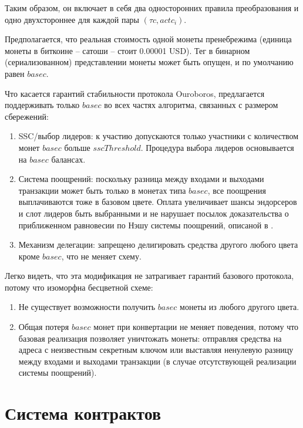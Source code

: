 \documentclass[specification,annotation]{itmo-student-thesis}
\begin{document}
Таким образом, он включает в себя два односторонних правила
преобразования и одно двухстороннее для каждой пары $(\tau c, actc_i)$.

Предполагается, что реальная стоимость одной монеты пренебрежима
(единица монеты в биткоине -- сатоши -- стоит 0.00001 USD). Тег в
бинарном (сериализованном) представлении монеты может быть опущен, и
по умолчанию равен $basec$.

Что касается гарантий стабильности протокола Ouroboros, предлагается
поддерживать только $basec$ во всех частях алгоритма, связанных с
размером сбережений:

\begin{enumerate}
\item SSC/выбор лидеров: к участию допускаются только участники с
  количеством монет $basec$ больше $sscThreshold$. Процедура выбора
  лидеров основывается на $basec$ балансах.
\item Система поощрений: поскольку разница между входами и выходами
  транзакции может быть только в монетах типа $basec$, все поощрения
  выплачиваются тоже в базовом цвете. Оплата увеличивает шансы
  эндорсеров и слот лидеров быть выбранными и не нарушает посылок
  доказательства о приближенном равновесии по Нэшу системы поощрений,
  описаной в \cite{ouroboros}.
\item Механизм делегации: запрещено делигировать средства другого
  любого цвета кроме $basec$, что не меняет схему.
\end{enumerate}

Легко видеть, что эта модификация не затрагивает гарантий базового
протокола, потому что изоморфна бесцветной схеме:

\begin{enumerate}
\item Не существует возможности получить $basec$ монеты из любого
  другого цвета.
\item Общая потеря $basec$ монет при конвертации не меняет поведения,
  потому что базовая реализация позволяет уничтожать монеты: отправляя
  средства на адреса с неизвестным секретным ключом или выставляя
  ненулевую разницу между входами и выходами транзакции (в случае
  отсутствующей реализации системы поощрений).
\end{enumerate}

\section{Система контрактов}
\end{document}
